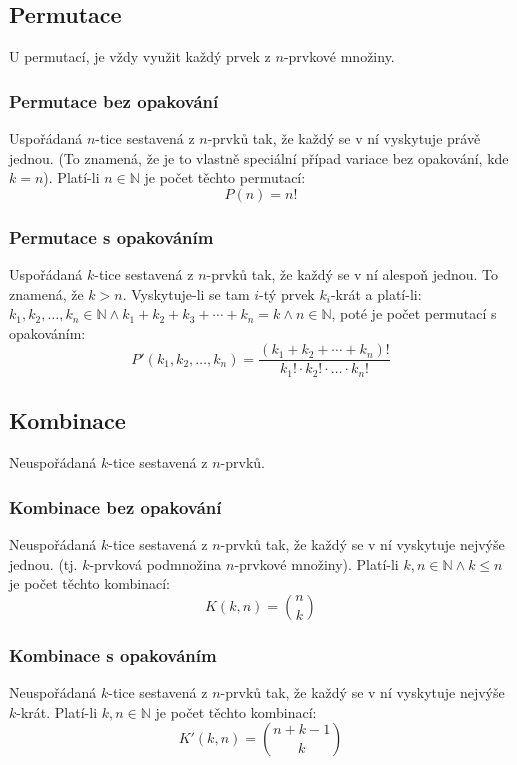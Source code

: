 \documentclass[12pt]{article}
\begin{document}
\subsection{Permutace}
U permutací, je vždy využit každý prvek z $n$-prvkové množiny.
\subsubsection{Permutace bez opakování}
Uspořádaná $n$-tice sestavená z $n$-prvků tak, že každý se v ní vyskytuje právě jednou. (To znamená, že je to vlastně speciální případ variace bez opakování, kde $k=n$). Platí-li $n \in \mathbb{N}$ je počet těchto permutací:
\begin{equation}
P(n) = n!
\end{equation}
\subsubsection{Permutace s opakováním}
Uspořádaná $k$-tice sestavená z $n$-prvků tak, že každý se v ní alespoň jednou. To znamená, že $k >n$.
Vyskytuje-li se tam $i$-tý prvek $k_i$-krát a platí-li: $k_1, k_2, \dotsc, k_n \in \mathbb{N} \land k_1 + k_2 + k_3 + \dotsb + k_n = k \land n \in \mathbb{N}$, poté je počet permutací s opakováním:
\begin{equation}
P'\left(k_1,k_2, \dotsc, k_n \right) = \frac{\left( k_1 + k_2 + \dotsb + k_n \right)!}{k_1! \cdot k_2 ! \cdot \dotso \cdot k_n!}
\end{equation}

\subsection{Kombinace}
Neuspořádaná $k$-tice sestavená z $n$-prvků.
\subsubsection{Kombinace bez opakování}
\label{sec:kombinace-bez}
Neuspořádaná $k$-tice sestavená z $n$-prvků tak, že každý se v ní vyskytuje nejvýše jednou. (tj. $k$-prvková podmnožina $n$-prvkové množiny). Platí-li $k,n \in \mathbb{N} \land k \leq n$ je počet těchto kombinací:
\begin{equation}
K\left(k,n\right) = \binom{n}{k}
\end{equation} 
\subsubsection{Kombinace s opakováním}
Neuspořádaná $k$-tice sestavená z $n$-prvků tak, že každý se v ní vyskytuje nejvýše $k$-krát. Platí-li $k,n \in \mathbb{N}$ je počet těchto kombinací:
\begin{equation}
K' \left(k,n\right) = \binom{n+k-1}{k}
\end{equation}
\end{document}
